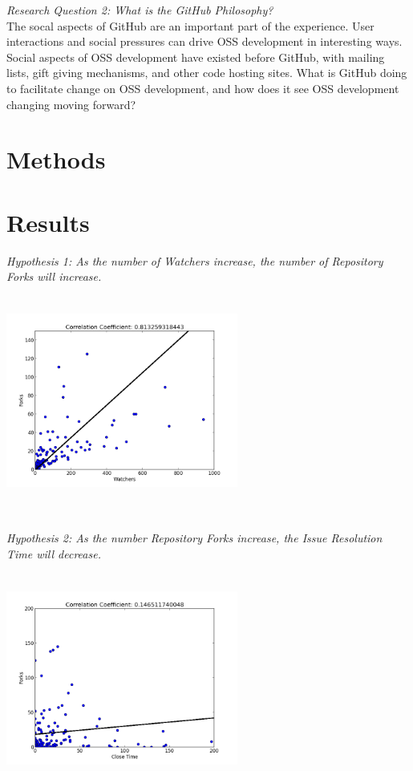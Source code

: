 \documentclass{proc}
\begin{document}
\emph{Research Question 2: What is the GitHub Philosophy?}\\
The socal aspects of GitHub are an important part of the experience\cite{dabbish2012social}. User interactions and social pressures can drive OSS development in interesting ways. Social aspects of OSS development have existed before GitHub, with mailing lists\cite{mockus2000case}, gift giving mechanisms\cite{bergquist2008power}, and other code hosting sites. What is GitHub doing to facilitate change on OSS development, and how does it see OSS development changing moving forward?

\section{Methods}

\section{Results}
\emph{Hypothesis 1: As the number of Watchers increase, the number of Repository Forks will increase.}\\
\includegraphics[height=3in,width=3in]{images/watcher_forks_scatterplot.png}

\emph{Hypothesis 2: As the number Repository Forks increase, the Issue Resolution Time will decrease.}\\
\includegraphics[height=3in,width=3in]{images/issue_close_time_forks_scatterplot.png}
\end{document}
